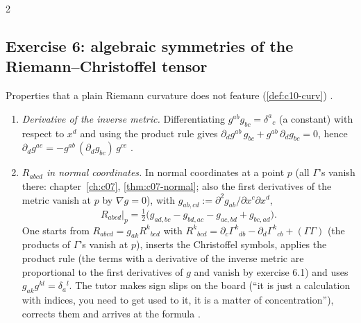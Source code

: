 \begin{paracol}{2}
\subsection*{Exercise 6: algebraic symmetries of the Riemann--Christoffel tensor}

Properties that a plain Riemann curvature does not feature (\cref{def:c10-curv}) .
\begin{enumerate}
  \item \emph{Derivative of the inverse metric.} Differentiating $g^{ab}g_{bc}=\delta^a{}_c$ (a constant) with respect to $x^d$ and using the product rule gives $\partial_d g^{ab}\,g_{bc}+g^{ab}\,\partial_dg_{bc}=0$, hence $\partial_dg^{ae}=-g^{ab}\,(\partial_dg_{bc})\,g^{ce}$ .
  \item \emph{$R_{abcd}$ in normal coordinates.} In normal coordinates at a point $p$ (all $\Gamma$'s vanish there: chapter~\ref{ch:c07}, \cref{thm:c07-normal}; also the first derivatives of the metric vanish at $p$ by $\nabla g=0$), with $g_{ab,cd}:=\partial^2g_{ab}/\partial x^c\partial x^d$,
        \[
          R_{abcd}\big|_p=\tfrac12\bigl(g_{ad,bc}-g_{bd,ac}-g_{ac,bd}+g_{bc,ad}\bigr).
        \]
        One starts from $R_{abcd}=g_{ak}R^k{}_{bcd}$ with $R^k{}_{bcd}=\partial_c\Gamma^k{}_{db}-\partial_d\Gamma^k{}_{cb}+(\Gamma\Gamma)$ (the products of $\Gamma$'s vanish at $p$), inserts the Christoffel symbols, applies the product rule (the terms with a derivative of the inverse metric are proportional to the first derivatives of $g$ and vanish by exercise 6.1) and uses $g_{ak}g^{kl}=\delta_a{}^l$. The tutor makes sign slips on the board (``it is just a calculation with indices, you need to get used to it, it is a matter of concentration''), corrects them and arrives at the formula .

\end{enumerate}
\end{paracol}
